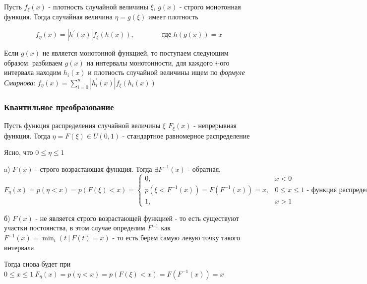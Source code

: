 \documentclass[12pt]{article}
\begin{document}
    \hypertarget{monotonoustransformationtheorem}{}

    \begin{MyTheorem}
        \Ths Пусть $f_\xi(x)$ - плотность случайной величины $\xi$, $g(x)$ - строго монотонная функция. Тогда 
        случайная величина $\eta = g(\xi)$ имеет плотность

        \[f_\eta(x) = |h^\prime(x)| f_\xi(h(x)), \qquad\qquad \text{где } h(g(x)) = x\]
    \end{MyTheorem}

    Если $g(x)$ не является монотонной функцией, то поступаем следующим образом: разбиваем $g(x)$ на интервалы монотонности, 
    для каждого $i$-ого интервала находим $h_i(x)$ и плотность случайной величины ищем по \textit{формуле Смирнова}: 
    $f_\eta(x) = \sum_{i = 0}^n |h_i^\prime(x)| f_\xi(h_i(x))$
    
    \hypertarget{quantiletransformation}{}

    \subsubsection{Квантильное преобразование}

    \begin{MyTheorem}
         Пусть функция распределения случайной величины $\xi$ $F_\xi(x)$ - непрерывная функция. 
        Тогда $\eta = F(\xi) \in U(0, 1)$ - стандартное равномерное распределение
    \end{MyTheorem}

    \begin{MyProof}
        Ясно, что $0 \leq \eta \leq 1$

        a) $F(x)$ - строго возрастающая функция. Тогда $\exists F^{-1}(x)$ - обратная, $F_\eta(x) = p(\eta < x) = p(F(\xi) < x) = 
        \begin{cases}0, & x < 0 \\ p(\xi < F^{-1}(x)) = F(F^{-1}(x)) = x, & 0 \leq x \leq 1 \text{ - функция распределения } U(0, 1) \\ 1, & x > 1 \end{cases}$

        б) $F(x)$ - не является строго возрастающей функцией - то есть существуют участки постоянства, в этом случае
        определим $F^{-1}$ как $F^{-1}(x) = \min_{t} (t \ | \ F(t) = x)$ - то есть берем самую левую точку такого интервала

        Тогда снова будет при $0 \leq x \leq 1 \ F_\eta(x) = p(\eta < x) = p(F(\xi) < x) = F(F^{-1}(x)) = x$

    \end{MyProof}
\end{document}
